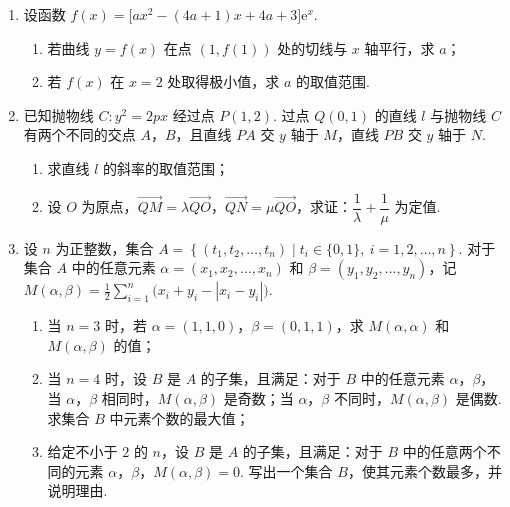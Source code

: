 \begin{description}
\begin{enumerate}[leftmargin=5pt]
\begin{enumerate}
    \item 从电影公司收集的电影中随机选取 \(1\) 部，求这部电影是获得好评的第四类电影的概率；
    \item 从第四类电影和第五类电影中各随机选取 \(1\) 部，估计恰有 \(1\) 部获得好评的概率；
    \item 假设每类电影得到人们喜欢的概率与表格中该类电影的好评率相等，用“\(\xi_k=1\)”表示第 \(k\) 类电影得到人们喜欢，“\(\xi_k=0\)”表示第 \(k\) 类电影没有得到人们喜欢（\(k=1,2,3,4,5,6\)）. 写出方差 \(D(\xi_1)\)，\(D(\xi_2)\)，\(D(\xi_3)\)，\(D(\xi_4)\)，\(D(\xi_5)\)，\(D(\xi_6)\) 的大小关系.
\end{enumerate}

        \item 设函数 \(f(x)=\bigl[ax^2-(4a+1)x+4a+3\bigr]{\mathrm{e}}^x\).

\begin{enumerate}
    \item 若曲线 \(y=f(x)\) 在点 \((1,f(1))\) 处的切线与 \(x\) 轴平行，求 \(a\)；
    \item 若 \(f(x)\) 在 \(x=2\) 处取得极小值，求 \(a\) 的取值范围.
\end{enumerate}

        \item 已知抛物线 \(C:y^2=2px\) 经过点 \(P(1,2)\). 过点 \(Q(0,1)\) 的直线 \(l\) 与抛物线 \(C\) 有两个不同的交点 \(A\)，\(B\)，且直线 \(PA\) 交 \(y\) 轴于 \(M\)，直线 \(PB\) 交 \(y\) 轴于 \(N\).

\begin{enumerate}
    \item 求直线 \(l\) 的斜率的取值范围；
    \item 设 \(O\) 为原点，\(\overrightarrow{QM}=\lambda\overrightarrow{QO}\)，\(\overrightarrow{QN}=\mu\overrightarrow{QO}\)，求证：\(\dfrac1\lambda+\dfrac1\mu\) 为定值.
\end{enumerate}

        \item 设 \(n\) 为正整数，集合 \(A=\left\{(t_1,t_2,\ldots,t_n)\mid t_i\in\{0,1\},\ i=1,2,\ldots,n\right\}\).
对于集合 \(A\) 中的任意元素 \(\alpha=(x_1,x_2,\ldots,x_n)\) 和 \(\beta=(y_1,y_2,\ldots,y_n)\)，记 \(M(\alpha,\beta)=\frac12\sum_{i=1}^n\bigl(x_i+y_i-|x_i-y_i|\bigr)\).

\begin{enumerate}
    \item 当 \(n=3\) 时，若 \(\alpha=(1,1,0)\)，\(\beta=(0,1,1)\)，求 \(M(\alpha,\alpha)\) 和 \(M(\alpha,\beta)\) 的值；
    \item 当 \(n=4\) 时，设 \(B\) 是 \(A\) 的子集，且满足：对于 \(B\) 中的任意元素 \(\alpha\)，\(\beta\)，当 \(\alpha\)，\(\beta\) 相同时，\(M(\alpha,\beta)\) 是奇数；当 \(\alpha\)，\(\beta\) 不同时，\(M(\alpha,\beta)\) 是偶数. 求集合 \(B\) 中元素个数的最大值；
    \item 给定不小于 \(2\) 的 \(n\)，设 \(B\) 是 \(A\) 的子集，且满足：对于 \(B\) 中的任意两个不同的元素 \(\alpha\)，\(\beta\)，\(M(\alpha,\beta)=0\). 写出一个集合 \(B\)，使其元素个数最多，并说明理由.
\end{enumerate}


\end{enumerate}
\end{description}
